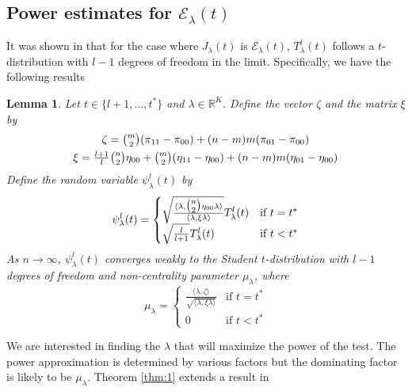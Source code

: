 \documentclass[draftcls]{IEEEtran}
\newtheorem{lemma}[theorem]{Lemma}
\theoremstyle{definition}
\begin{document}
\subsection{Power estimates for $\mathcal{E}_\lambda(t)$}
It was shown in
\cite{lee:_laten_proces_model_time_attrib_random_graph} that for the
case where $J_\lambda(t)$ is $\mathcal{E}_{\lambda}(t)$, $T_{\lambda}^{l}(t)$ 
follows a $t$-distribution with $l - 1$
degrees of freedom in the limit. Specifically, we have the following
results
\begin{lemma}
  \label{lem:1}
  Let $t \in \{l+1, \dots, t^{*}\}$ and $\lambda \in
  \mathbb{R}^{K}$. Define the vector $\zeta$ and the matrix $\xi$ by
  \begin{gather*}
    \zeta = \tbinom{m}{2}(\pi_{11} - \pi_{00}) + (n-m)m(\pi_{01} -
    \pi_{00}) \\
    \xi = \tfrac{l+1}{l}\tbinom{n}{2} \eta_{00} +
          \tbinom{m}{2}(\eta_{11} - \eta_{00}) + (n-m)m(\eta_{01} -
          \eta_{00})
  \end{gather*}
  Define the random variable $\psi^{l}_{\lambda}(t)$ by
  \begin{equation}
    \label{eq:10}
    \psi^{l}_{\lambda}(t) = \begin{cases}
      \sqrt{\frac{\langle \lambda, \tbinom{n}{2} \eta_{00}
            \lambda \rangle}{\langle \lambda, \xi
            \lambda \rangle}} T_{\lambda}^{l}(t) & \text{if $t = t^{*}$} \\
      \sqrt{\frac{l}{l + 1}} T_{\lambda}^{l}(t)& \text{if $t < t^{*}$}
      \end{cases}
  \end{equation}
As $n \rightarrow \infty$,
  $\psi^{l}_{\lambda}(t)$ converges weakly to the Student
  $t$-distribution with $l-1$ degrees of freedom and non-centrality
  parameter $\mu_{\lambda}$, where
  \begin{equation}
    \label{eq:15}
    \mu_{\lambda} = \begin{cases}
      \frac{\langle \lambda, \zeta \rangle}{\sqrt{\langle \lambda, \xi \lambda \rangle}} & \text{if $t = t^{*}$} \\
      0 & \text{if $t < t^{*}$}
    \end{cases}
  \end{equation}
\end{lemma}
We are interested in finding the $\lambda$ that will maximize the
power of the test. The power approximation is determined by various
factors but the dominating factor is likely to be
$\mu_{\lambda}$. Theorem \ref{thm:1} extends a result in
\end{document}
